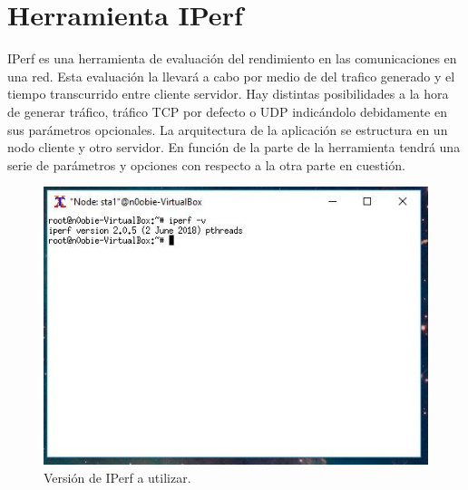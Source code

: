 \appendix
\clearpage
\addappheadtotoc
\appendixpage
\chapter{Herramienta IPerf}
IPerf es una herramienta de evaluación del rendimiento en las comunicaciones en una red. Esta evaluación la llevará a cabo por medio de del trafico generado y el tiempo transcurrido entre cliente servidor. Hay distintas posibilidades a la hora de generar tráfico, tráfico TCP por defecto o UDP indicándolo debidamente en sus parámetros opcionales. La arquitectura de la aplicación se estructura en un nodo cliente y otro servidor. En función de la parte de la herramienta tendrá una serie de parámetros y opciones con respecto a la otra parte en cuestión.\newline
\newline
\begin{figure}[!htb]
  \centering
    \includegraphics[width=0.7\linewidth]{./img/anexos/1.JPG}
    \caption{Versión de IPerf a utilizar.}
  \label{fig:yo}
\end{figure}
